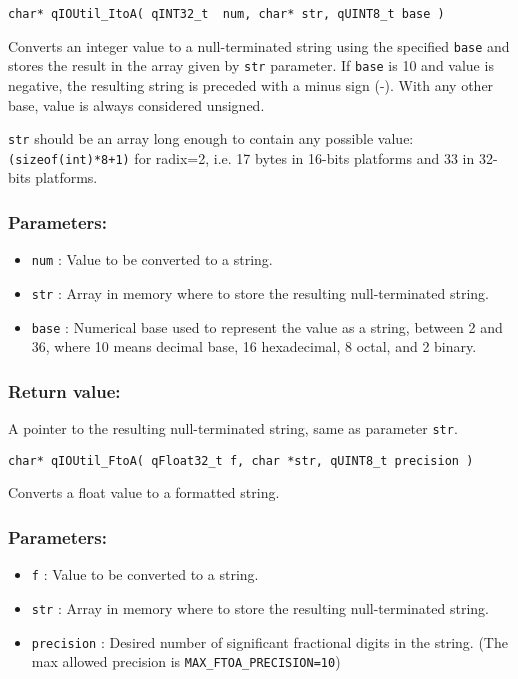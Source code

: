 \noindent\hrulefill

\begin{lstlisting}[style=CStyle]
char* qIOUtil_ItoA( qINT32_t  num, char* str, qUINT8_t base )
\end{lstlisting}

Converts an integer value to a null-terminated string using the specified \lstinline{base} and stores the result in the array given by \lstinline{str} parameter. If \lstinline{base} is 10 and value is negative, the resulting string is preceded with a minus sign (-). With any other base, value is always considered unsigned. 

\lstinline{str} should be an array long enough to contain any possible value: \lstinline{(sizeof(int)*8+1)} for radix=2, i.e. 17 bytes in 16-bits platforms and 33 in 32-bits platforms.

\subsubsection*{Parameters:}
\begin{itemize}
    \item \lstinline{num} : Value to be converted to a string.
    \item \lstinline{str} : Array in memory where to store the resulting null-terminated string.
    \item \lstinline{base} : Numerical base used to represent the value as a string, between 2 and 36, where 10 means decimal base, 16 hexadecimal, 8 octal, and 2 binary.
\end{itemize}

\subsubsection*{Return value:}
A pointer to the resulting null-terminated string, same as parameter \lstinline{str}.


\noindent\hrulefill

\begin{lstlisting}[style=CStyle]
char* qIOUtil_FtoA( qFloat32_t f, char *str, qUINT8_t precision )
\end{lstlisting}

Converts a float value to a formatted string. 

\subsubsection*{Parameters:}
\begin{itemize}
    \item \lstinline{f} : Value to be converted to a string.
    \item \lstinline{str} : Array in memory where to store the resulting null-terminated string.
    \item \lstinline{precision} : Desired number of significant fractional digits in the string. (The max allowed precision is \lstinline{MAX_FTOA_PRECISION=10})
\end{itemize}

